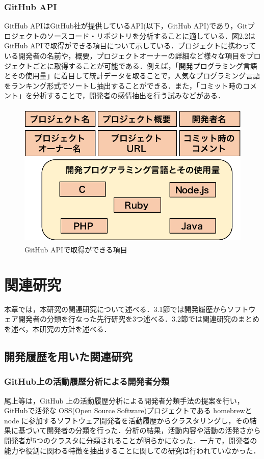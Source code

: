 \documentclass{funthesis}
\begin{document}
\subsection{GitHub API}
GitHub APIはGitHub社が提供しているAPI(以下，GitHub API)であり，Gitプロジェクトのソースコード・リポジトリを分析することに適している\cite{GitHub_API}．図2.2はGitHub APIで取得ができる項目について示している．プロジェクトに携わっている開発者の名前や，概要，プロジェクトオーナーの詳細など様々な項目をプロジェクトごとに取得することが可能である．例えば，「開発プログラミング言語とその使用量」に着目して統計データを取ることで，人気なプログラミング言語をランキング形式でソートし抽出することができる．また，「コミット時のコメント」を分析することで，開発者の感情抽出を行う試みなどがある．
\begin{figure}[H]
\centering  %
\includegraphics[clip,width=12cm,height=7cm]{figures/github_api.pdf}
  \caption{GitHub APIで取得ができる項目}    \label{sample}
\end{figure}
\chapter{関連研究}
本章では，本研究の関連研究について述べる．3.1節では開発履歴からソフトウェア開発者の分類を行なった先行研究を3つ述べる．3.2節では関連研究のまとめを述べ，本研究の方針を述べる．
\section{開発履歴を用いた関連研究}
\subsection{GitHub上の活動履歴分析による開発者分類}
尾上等は，GitHub 上の活動履歴分析による開発者分類手法の提案を行い，GitHubで活発な OSS(Open Source Software)プロジェクトである homebrewとnode に参加するソフトウェア開発者を活動履歴からクラスタリングし，その結果に基づいて開発者の分類を行った\cite{Onoue_Japan}．分析の結果，活動内容や活動の活発さから開発者が5つのクラスタに分類されることが明らかになった．一方で，開発者の能力や役割に関わる特徴を抽出することに関しての研究は行われていなかった．
\end{document}
